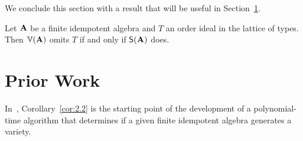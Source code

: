 \begin{comment}
  Table~\ref{tab:1} is from~\cite{MR3350327} and gives another characterization of
omitting types.
\begin{center}
  \begin{table}
    \caption{\cite{MR3350327}.}
    \label{tab:1}
    \begin{tabular}{|l|l|}
      \hline
      Omitting Class &  Equivalent Property\\
      \hline
      $\sM_{\{1\}}$ & satisfies a nontrivial idempotent \malcev condition \\
      \hline
      $\sM_{\{1,5\}}$ & satisfies a nontrivial congruence identity\\ %
      \hline
      $\sM_{\{1,4,5\}}$ & congruence n-permutable, for some $n > 1$ \\
      \hline
      $\sM_{\{1,2\}}$ & congruence meet semidistributive \\
      \hline
      $\sM_{\{1,2,5\}}$ & congruence join semidistributive\\ %
      \hline
      $\sM_{\{1,2,4,5\}}$ & congruence $n$-permutable for some $n$ and\\
      &congruence join semidistributive\\
      \hline
    \end{tabular}
  \end{table}
\end{center}

\end{comment}

We conclude this section with a result that will be useful in Section~\ref{sec:freese-valer-lemm}.
\begin{corollary}
  \label{cor:2.2}
  Let $\mathbf{A}$ be a finite idempotent algebra and $T$ an order ideal in the
  lattice of types. Then $\operatorname{\mathbb{V}}(\mathbf{A})$ omits $T$ if and only if $\mathsf{S}(\mathbf{A})$ does.
\end{corollary}




\section{Prior Work}
\label{sec:freese-valer-lemm}
In~\cite{Freese:2009}, Corollary~\ref{cor:2.2} is the starting point of the
development of a polynomial-time algorithm that determines if a given finite
idempotent algebra generates a \cm variety. 

